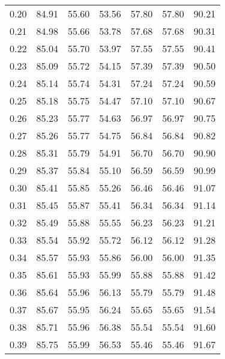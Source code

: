 \begin{tabular}{|c|c|c|c|c|c|c|}
      0.20 &     84.91 &     55.60 &      53.56 &   57.80 &      57.80 &         90.21 \\
      0.21 &     84.98 &     55.66 &      53.78 &   57.68 &      57.68 &         90.31 \\
      0.22 &     85.04 &     55.70 &      53.97 &   57.55 &      57.55 &         90.41 \\
      0.23 &     85.09 &     55.72 &      54.15 &   57.39 &      57.39 &         90.50 \\
      0.24 &     85.14 &     55.74 &      54.31 &   57.24 &      57.24 &         90.59 \\
      0.25 &     85.18 &     55.75 &      54.47 &   57.10 &      57.10 &         90.67 \\
      0.26 &     85.23 &     55.77 &      54.63 &   56.97 &      56.97 &         90.75 \\
      0.27 &     85.26 &     55.77 &      54.75 &   56.84 &      56.84 &         90.82 \\
      0.28 &     85.31 &     55.79 &      54.91 &   56.70 &      56.70 &         90.90 \\
      0.29 &     85.37 &     55.84 &      55.10 &   56.59 &      56.59 &         90.99 \\
      0.30 &     85.41 &     55.85 &      55.26 &   56.46 &      56.46 &         91.07 \\
      0.31 &     85.45 &     55.87 &      55.41 &   56.34 &      56.34 &         91.14 \\
      0.32 &     85.49 &     55.88 &      55.55 &   56.23 &      56.23 &         91.21 \\
      0.33 &     85.54 &     55.92 &      55.72 &   56.12 &      56.12 &         91.28 \\
      0.34 &     85.57 &     55.93 &      55.86 &   56.00 &      56.00 &         91.35 \\
      0.35 &     85.61 &     55.93 &      55.99 &   55.88 &      55.88 &         91.42 \\
      0.36 &     85.64 &     55.96 &      56.13 &   55.79 &      55.79 &         91.48 \\
      0.37 &     85.67 &     55.95 &      56.24 &   55.65 &      55.65 &         91.54 \\
      0.38 &     85.71 &     55.96 &      56.38 &   55.54 &      55.54 &         91.60 \\
      0.39 &     85.75 &     55.99 &      56.53 &   55.46 &      55.46 &         91.67 \\

\end{tabular}

